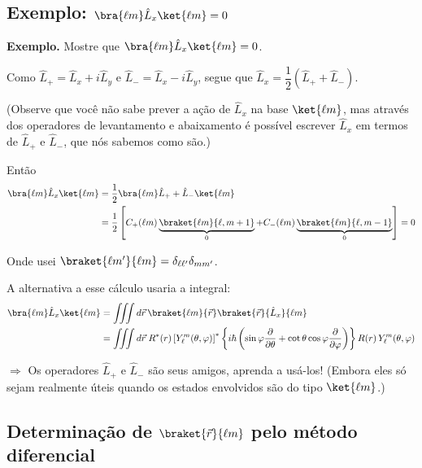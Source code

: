 \subsection*{Exemplo: $\bra{\ell m} \hat{L}_x \ket{\ell m} = 0$}

\textbf{Exemplo.} Mostre que $\bra{\ell m} \hat{L}_x \ket{\ell m} = 0$.

Como $\hat{L}_+ = \hat{L}_x + i\hat{L}_y$ e $\hat{L}_- = \hat{L}_x - i\hat{L}_y$, segue que $\hat{L}_x = \dfrac{1}{2}(\hat{L}_+ + \hat{L}_-)$.

(Observe que você não sabe prever a ação de $\hat{L}_x$ na base $\ket{\ell m}$, mas através dos operadores de levantamento e abaixamento é possível escrever $\hat{L}_x$ em termos de $\hat{L}_+$ e $\hat{L}_-$, que nós sabemos como são.)

Então
\begin{align}
    \bra{\ell m} \hat{L}_x \ket{\ell m} &= \frac{1}{2} \bra{\ell m} \hat{L}_+ + \hat{L}_- \ket{\ell m} \notag \\
    &= \frac{1}{2}\left[ C_+(\ell m) \underbrace{\braket{\ell m}{\ell, m+1}}_{0} + C_-(\ell m) \underbrace{\braket{\ell m}{\ell, m-1}}_{0} \right] = 0
\label{eq:aula20_exemplo_Lx}
\end{align}

Onde usei $\braket{\ell m'}{\ell m} = \delta_{\ell\ell'}\delta_{mm'}$.

A alternativa a esse cálculo usaria a integral:
\begin{align}
    \bra{\ell m} \hat{L}_x \ket{\ell m} &= \iiint d\vec{r} \, \braket{\ell m}{\vec{r}} \braket{\vec{r}}{\hat{L}_x}{\ell m} \notag \\
    &= \iiint d\vec{r} \; R^*(r) \left[Y_\ell^{m}(\theta,\varphi)\right]^* \left\{ i\hbar \left( \sin\varphi \frac{\partial}{\partial \theta} + \cot\theta\cos\varphi \frac{\partial}{\partial \varphi} \right) \right\} R(r)\, Y_\ell^m(\theta,\varphi)
\label{eq:aula20_exemplo_Lx_integral}
\end{align}

$\Rightarrow$ Os operadores $\hat{L}_+$ e $\hat{L}_-$ são seus amigos, aprenda a usá-los! (Embora eles só sejam realmente úteis quando os estados envolvidos são do tipo $\ket{\ell m}$.)

\subsection*{Determinação de $\braket{\vec{r}}{\ell m}$ pelo método diferencial}

